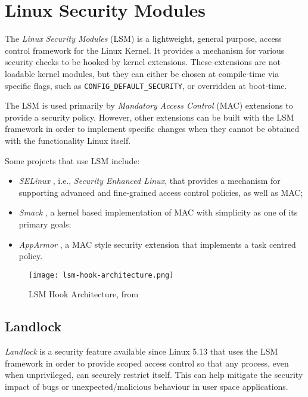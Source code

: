 \section{Linux Security Modules}

The \textit{Linux Security Modules} (LSM) \cite{lsm-2002, kernel-lsm}
is a lightweight, general purpose, access control framework for the Linux Kernel.
It provides a mechanism for various security checks to be hooked by kernel extensions.
These extensions are not loadable kernel modules, but they can either be chosen at
compile-time via specific flags, such as \texttt{CONFIG\_DEFAULT\_SECURITY}, or overridden at boot-time.

The LSM is used primarily by \textit{Mandatory Access Control} (MAC) extensions to
provide a security policy. However, other extensions can be built with the LSM framework
in order to implement specific changes when they cannot be obtained with the functionality Linux itself.

Some projects that use LSM include:
\begin{itemize}
  \item \textit{SELinux} \cite{selinux}, i.e., \textit{Security Enhanced Linux}, that provides a mechanism for supporting advanced and fine-grained access control policies, as well as MAC;
  \item \textit{Smack} \cite{smack}, a kernel based implementation of MAC with simplicity as one of its primary goals;
  \item \textit{AppArmor} \cite{apparmor}, a MAC style security extension that implements a task centred policy.
\end{itemize}

\begin{figure}[ht]
  \centering
  \texttt{[image: lsm-hook-architecture.png]}
  \caption{LSM Hook Architecture, from \cite{kernel-lsm}}
  \label{fig:lsm-hook-architecture}
\end{figure}

\subsection{Landlock}
\label{sec:intro-lsm-landlock}

\textit{Landlock} \cite{landlock-kernel, landlock-user-space} is a security feature available since Linux 5.13
that uses the LSM framework in order to provide scoped access control
so that any process, even when unprivileged, can securely restrict itself.
This can help mitigate the security impact of bugs or unexpected/malicious behaviour
in user space applications.

